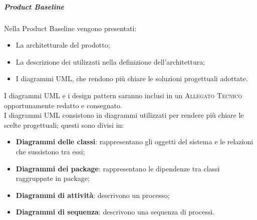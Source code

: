 \documentclass[../norme-di-progetto.tex]{subfiles}
\begin{document}
\subparagraph*{Product Baseline}
Nella Product Baseline vengono presentati:
\begin{itemize}
  \item La  architetturale del prodotto;
  \item La descrizione dei  utilizzati nella definizione dell'architettura;
  \item I diagrammi UML, che rendono più chiare le soluzioni progettuali adottate.
\end{itemize}
I diagrammi UML e i design pattern saranno inclusi in un \textsc{Allegato Tecnico} opportunamente redatto e consegnato.\\
I diagrammi UML consistono in diagrammi utilizzati per rendere più chiare le scelte progettuali; questi sono divisi in:
\begin{itemize}
  \item \textbf{Diagrammi delle classi}: rappresentano gli oggetti del sistema e le relazioni che sussistono tra essi;
  \item \textbf{Diagrammi dei package}: rappresentano le dipendenze tra classi raggruppate in package;
  \item \textbf{Diagrammi di attività}: descrivono un processo;
  \item \textbf{Diagrammi di sequenza}: descrivono una sequenza di processi.
\end{itemize}

\end{document}
